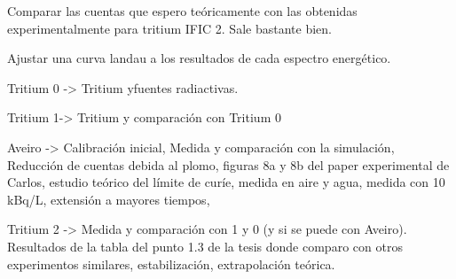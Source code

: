 Comparar las cuentas que espero teóricamente con las obtenidas experimentalmente para tritium IFIC 2. Sale bastante bien.

Ajustar una curva landau a los resultados de cada espectro energético.

Tritium 0 -> Tritium yfuentes radiactivas.

Tritium 1-> Tritium y comparación con Tritium 0

Aveiro -> Calibración inicial, Medida y comparación con la simulación, Reducción de cuentas debida al plomo, figuras 8a y 8b del paper experimental de Carlos, estudio teórico del límite de curíe, medida en aire y agua, medida con 10 kBq/L, extensión a mayores tiempos,

Tritium 2 -> Medida y comparación con 1 y 0 (y si se puede con Aveiro). Resultados de la tabla del punto 1.3 de la tesis donde comparo con otros experimentos similares, estabilización, extrapolación teórica.
